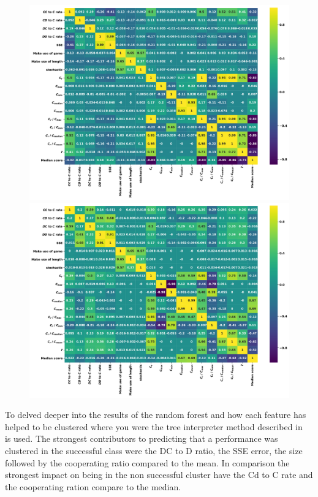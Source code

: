 \documentclass{article}
\begin{document}
\begin{figure}
\begin{minipage}{.5\textwidth}
        \includegraphics[width=\textwidth]{../images/probend_correlation_plot.pdf}
    \end{minipage}
    \begin{minipage}{.5\textwidth}
        \centering
        \includegraphics[width=\textwidth]{../images/probend_noise_correlation_plot.pdf}
    \end{minipage}
\end{figure}


To delved deeper into the results of the random forest and how each feature
has helped to be clustered where you were the tree interpreter method
described in~\cite{} is used. The strongest contributors to predicting that
a performance was clustered in the successful class were the DC to D ratio,
the SSE error, the size followed by the cooperating ratio compared to the mean.
In comparison the strongest impact on being in the non successful cluster
have the Cd to C rate and the cooperating ration compare to the median.
\end{document}
